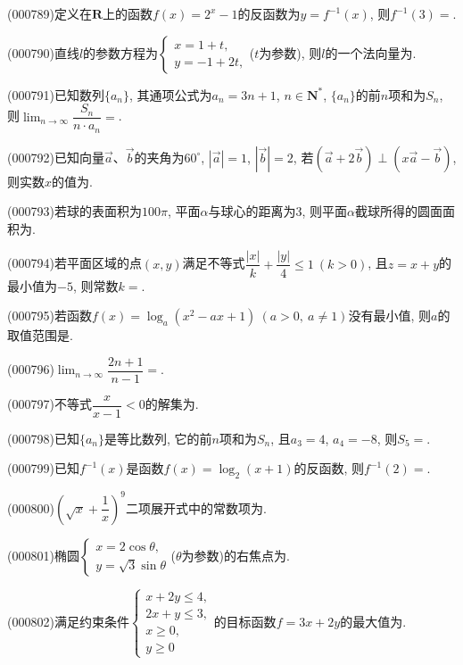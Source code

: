 \item (000789)定义在$\mathbf{R}$上的函数$f(x)=2^x-1$的反函数为$y=f^{-1}(x)$, 则$f^{-1}(3)=$.
\item (000790)直线$l$的参数方程为$\begin{cases}  x=1+t, \\ y=-1+2t, \end{cases}$($t$为参数), 则$l$的一个法向量为.
\item (000791)已知数列$\{a_n\}$, 其通项公式为$a_n=3n+1$, $n\in \mathbf{N}^*$, $\{a_n\}$的前$n$项和为$S_n$, 则$\displaystyle\lim_{n\to\infty}\dfrac{S_n}{n\cdot {a_n}}=$.
\item (000792)已知向量$\overrightarrow a$、$\overrightarrow b$的夹角为$60^{\circ}$, $|\overrightarrow a|=1$, $|\overrightarrow b|=2$, 若$(\overrightarrow a+2 \overrightarrow b)\perp (x\overrightarrow a-\overrightarrow b)$, 则实数$x$的值为.
\item (000793)若球的表面积为$100 \pi$, 平面$\alpha$与球心的距离为$3$, 则平面$\alpha$截球所得的圆面面积为.
\item (000794)若平面区域的点$(x,y)$满足不等式$\dfrac{|x|}k+\dfrac{|y|}4\le 1\ (k>0)$, 且$z=x+y$的最小值为$-5$, 则常数$k=$.
\item (000795)若函数$f(x)={\log_a}(x^2-ax+1)\ (a>0, \ a\ne 1)$没有最小值, 则$a$的取值范围是.
\item (000796)$\displaystyle\lim_{n\to \infty}\dfrac{2n+1}{n-1}=$.
\item (000797)不等式$\dfrac x{x-1}<0$的解集为.
\item (000798)已知$\{a_n\}$是等比数列, 它的前$n$项和为$S_n$, 且$a_3=4$, $a_4=-8$, 则$S_5=$.
\item (000799)已知$f^{-1}(x)$是函数$f(x)=\log_2(x+1)$的反函数, 则$f^{-1}(2)=$.
\item (000800)$(\sqrt x+\dfrac1x)^9$二项展开式中的常数项为.
\item (000801)椭圆$\begin{cases} x=2 \cos\theta, \\ y=\sqrt3\sin\theta  \end{cases}$($\theta$为参数)的右焦点为.
\item (000802)满足约束条件$\begin{cases} x+2y\le 4, \\ 2x+y\le 3, \\ x\ge 0, \\ y\ge 0 \end{cases}$的目标函数$f=3x+2y$的最大值为.
